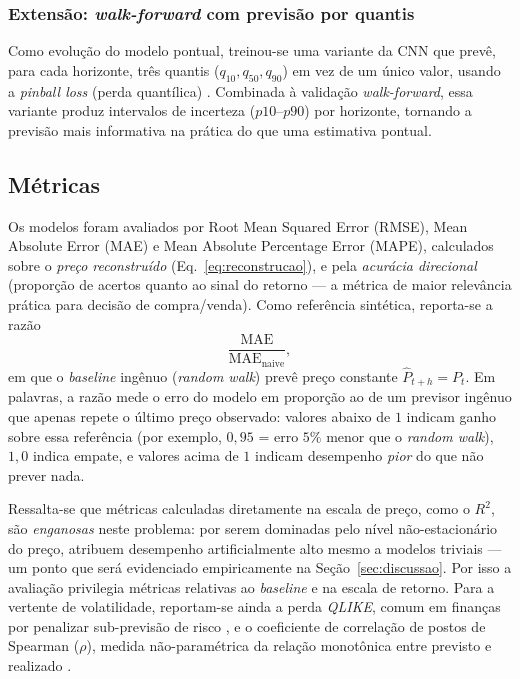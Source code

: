 \documentclass[12pt]{article}
\begin{document}
\subsubsection{Extensão: \emph{walk-forward} com previsão por quantis}
\label{sec:quantis}

Como evolução do modelo pontual, treinou-se uma variante da CNN que prevê, para
cada horizonte, três quantis ($q_{10}, q_{50}, q_{90}$) em vez de um único
valor, usando a \emph{pinball loss} (perda quantílica)
\cite{koenkerbassett1978}. Combinada à validação \emph{walk-forward}, essa
variante produz intervalos de incerteza ($p10$--$p90$) por horizonte, tornando a
previsão mais informativa na prática do que uma estimativa pontual.

\subsection{Métricas}
\label{sec:metricas}

Os modelos foram avaliados por Root Mean Squared Error (RMSE), Mean Absolute Error (MAE) e Mean Absolute Percentage Error (MAPE), calculados sobre o
\emph{preço reconstruído} (Eq.~\ref{eq:reconstrucao}), e pela \emph{acurácia
direcional} (proporção de acertos quanto ao sinal do retorno --- a métrica de
maior relevância prática para decisão de compra/venda). Como referência
sintética, reporta-se a razão
\begin{equation}
  \frac{\mathrm{MAE}}{\mathrm{MAE}_{\text{naive}}},
\end{equation}
em que o \emph{baseline} ingênuo (\emph{random walk}) prevê preço constante
$\hat{P}_{t+h} = P_t$. Em palavras, a razão mede o erro do modelo em proporção
ao de um previsor ingênuo que apenas repete o último preço observado: valores
abaixo de $1$ indicam ganho sobre essa referência (por exemplo, $0{,}95$ = erro
$5\%$ menor que o \emph{random walk}), $1{,}0$ indica empate, e valores acima
de $1$ indicam desempenho \emph{pior} do que não prever nada.

Ressalta-se que métricas calculadas diretamente na escala de preço, como o
$R^2$, são \emph{enganosas} neste problema: por serem dominadas pelo nível
não-estacionário do preço, atribuem desempenho artificialmente alto mesmo a
modelos triviais --- um ponto que será evidenciado empiricamente na
Seção~\ref{sec:discussao}. Por isso a avaliação privilegia métricas relativas ao
\emph{baseline} e na escala de retorno. Para a vertente de volatilidade,
reportam-se ainda a perda \emph{QLIKE}, comum em finanças por penalizar
sub-previsão de risco \cite{patton2011volatility,zhang2015rsgarch}, e o
coeficiente de correlação de postos de Spearman ($\rho$), medida não-paramétrica
da relação monotônica entre previsto e realizado \cite{dellinger2017spearman}.
\end{document}
